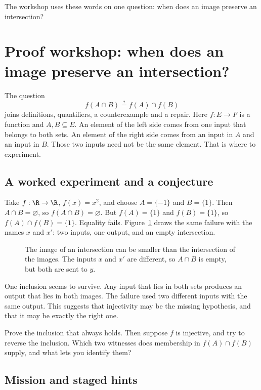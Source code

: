 The workshop uses these words on one question: when does an image preserve an intersection?

\section{Proof workshop: when does an image preserve an intersection?}

The question
\[
f(A\cap B)\stackrel{?}{=}f(A)\cap f(B)
\]
joins definitions, quantifiers, a counterexample and a repair. Here $f:E\to F$ is a function and $A,B\subseteq E$. An element of the left side comes from one input that belongs to both sets. An element of the right side comes from an input in $A$ and an input in $B$. Those two inputs need not be the same element. That is where to experiment.

\subsection*{A worked experiment and a conjecture}

Take $f:\R\to\R$, $f(x)=x^2$, and choose $A=\{-1\}$ and $B=\{1\}$. Then $A\cap B=\varnothing$, so $f(A\cap B)=\varnothing$. But $f(A)=\{1\}$ and $f(B)=\{1\}$, so $f(A)\cap f(B)=\{1\}$. Equality fails. Figure~\ref{fig:lang-intersection} draws the same failure with the names $x$ and $x'$: two inputs, one output, and an empty intersection.

\begin{figure}[ht]
\centering
{}
\caption{The image of an intersection can be smaller than the intersection of the images. The inputs $x$ and $x'$ are different, so $A\cap B$ is empty, but both are sent to $y$.}
\label{fig:lang-intersection}
\end{figure}

One inclusion seems to survive. Any input that lies in both sets produces an output that lies in both images. The failure used two different inputs with the same output. This suggests that injectivity may be the missing hypothesis, and that it may be exactly the right one.

\begin{think}
Prove the inclusion that always holds. Then suppose $f$ is injective, and try to reverse the inclusion. Which two witnesses does membership in $f(A)\cap f(B)$ supply, and what lets you identify them?
\end{think}

\subsection*{Mission and staged hints}

